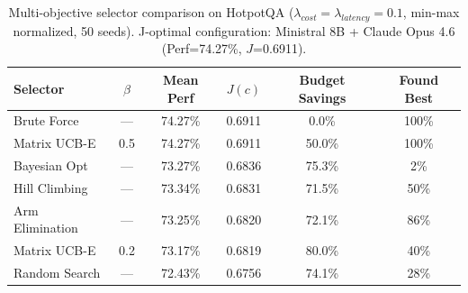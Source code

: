\begin{table}[!htbp]
\centering
\small
\renewcommand{\arraystretch}{1.1}
\begin{tabular}{lccccc}
\toprule
\textbf{Selector} & \textbf{$\beta$} & \textbf{Mean Perf} & \textbf{$J(c)$} & \textbf{Budget Savings} & \textbf{Found Best} \\
\midrule
Brute Force & --- & 74.27\% & 0.6911 & 0.0\% & 100\% \\
\midrule
Matrix UCB-E & 0.5 & 74.27\% & 0.6911 & 50.0\% & 100\% \\
Bayesian Opt & --- & 73.27\% & 0.6836 & 75.3\% & 2\% \\
Hill Climbing & --- & 73.34\% & 0.6831 & 71.5\% & 50\% \\
Arm Elimination & --- & 73.25\% & 0.6820 & 72.1\% & 86\% \\
Matrix UCB-E & 0.2 & 73.17\% & 0.6819 & 80.0\% & 40\% \\
Random Search & --- & 72.43\% & 0.6756 & 74.1\% & 28\% \\
\bottomrule
\end{tabular}
\caption{Multi-objective selector comparison on HotpotQA ($\lambda_{cost}=\lambda_{latency}=0.1$, min-max normalized, 50 seeds). J-optimal configuration: Ministral 8B + Claude Opus 4.6 (Perf=74.27\%, $J$=0.6911).}
\label{tab:multiobjective-hotpotqa}
\end{table}
